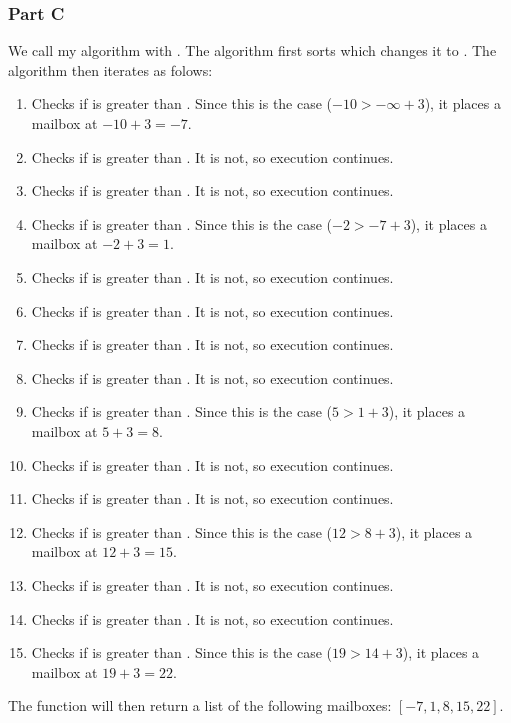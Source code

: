 \documentclass[12pt]{article}
\begin{document}
\subsubsection*{Part C}
We call my algorithm with . The algorithm first sorts  which changes it to \code{[-10, -8, -5, -2, -1, 1, 2, 4, 5, 8, 11, 12, 14, 16, 19]}. The algorithm then iterates as folows:
\begin{enumerate}
\item Checks if  is greater than . Since this is the case ($-10 > -\infty + 3$), it places a mailbox at $-10 + 3 = -7$.
\item Checks if  is greater than . It is not, so execution continues.
\item Checks if  is greater than . It is not, so execution continues.
\item Checks if  is greater than . Since this is the case ($-2 > -7 + 3$), it places a mailbox at $-2 + 3 = 1$.
\item Checks if  is greater than . It is not, so execution continues.
\item Checks if  is greater than . It is not, so execution continues.
\item Checks if  is greater than . It is not, so execution continues.
\item Checks if  is greater than . It is not, so execution continues.
\item Checks if  is greater than . Since this is the case ($5 > 1 + 3$), it places a mailbox at $5 + 3 = 8$.
\item Checks if  is greater than . It is not, so execution continues.
\item Checks if  is greater than . It is not, so execution continues.
\item Checks if  is greater than . Since this is the case ($12 > 8 + 3$), it places a mailbox at $12 + 3 = 15$.
\item Checks if  is greater than . It is not, so execution continues.
\item Checks if  is greater than . It is not, so execution continues.
\item Checks if  is greater than . Since this is the case ($19 > 14 + 3$), it places a mailbox at $19 + 3 = 22$.
\end{enumerate}
The function will then return a list of the following mailboxes: $[-7, 1, 8, 15, 22]$.
\end{document}
